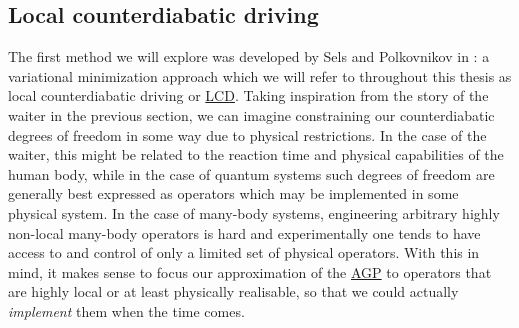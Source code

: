 \documentclass[a4paper,oneside,11pt]{book}
\newcommand{\acrref}[1]{\hyperref[acr:#1]{#1}}
\begin{document}
    \subsection{Local counterdiabatic driving}\label{sec:2.4.1_LCD}

    The first method we will explore was developed by Sels and Polkovnikov in \cite{sels_minimizing_2017}: a variational minimization approach which we will refer to throughout this thesis as local counterdiabatic driving or \acrref{LCD}. Taking inspiration from the story of the waiter in the previous section, we can imagine constraining our counterdiabatic degrees of freedom in some way due to physical restrictions. In the case of the waiter, this might be related to the reaction time and physical capabilities of the human body, while in the case of quantum systems such degrees of freedom are generally best expressed as operators which may be implemented in some physical system. In the case of many-body systems, engineering arbitrary highly non-local many-body operators is hard and experimentally one tends to have access to and control of only a limited set of physical operators. With this in mind, it makes sense to focus our approximation of the \acrref{AGP} to operators that are highly local or at least physically realisable, so that we could actually \emph{implement} them when the time comes.
\end{document}
